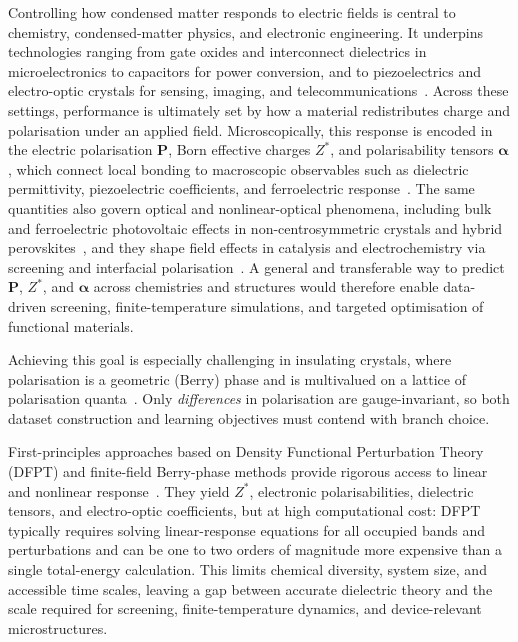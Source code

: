 \documentclass[aps,physrev,graphicx,amsmath,amssymb,
               reprint,superscriptaddress]{revtex4-2}
\begin{document}
Controlling how condensed matter responds to electric fields is central to chemistry, condensed-matter physics, and electronic engineering. It underpins technologies ranging from gate oxides and interconnect dielectrics in microelectronics to capacitors for power conversion, and to piezoelectrics and electro-optic crystals for sensing, imaging, and telecommunications~\cite{Scott2007,Damjanovic1998,Boyd2003,Robertson2006}. Across these settings, performance is ultimately set by how a material redistributes charge and polarisation under an applied field. Microscopically, this response is encoded in the electric polarisation $\mathbf P$, Born effective charges $Z^*$, and polarisability tensors $\boldsymbol\alpha$, which connect local bonding to macroscopic observables such as dielectric permittivity, piezoelectric coefficients, and ferroelectric response~\cite{king-smith-vanderbilt-1993,resta-1994,gonze_dynamical_1997,rabe_modern_2007}. The same quantities also govern optical and nonlinear-optical phenomena, including bulk and ferroelectric photovoltaic effects in non-centrosymmetric crystals and hybrid perovskites~\cite{Young2012,Cook2017,Dai2023,Butler2015Photoferroics,Frost2014MolecularFerroelectric}, and they shape field effects in catalysis and electrochemistry via screening and interfacial polarisation~\cite{Che2018,Huang2019,Leonard2021,Yu2022,Long2025}. A general and transferable way to predict $\mathbf P$, $Z^*$, and $\boldsymbol\alpha$ across chemistries and structures would therefore enable data-driven screening, finite-temperature simulations, and targeted optimisation of functional materials.

Achieving this goal is especially challenging in insulating crystals, where polarisation is a geometric (Berry) phase and is multivalued on a lattice of polarisation quanta~\cite{king-smith-vanderbilt-1993,resta-1994}. Only \emph{differences} in polarisation are gauge-invariant, so both dataset construction and learning objectives must contend with branch choice.

First-principles approaches based on Density Functional Perturbation Theory (DFPT) and finite-field Berry-phase methods provide rigorous access to linear and nonlinear response~\cite{gonze_dynamical_1997,nunes-gonze-2001,souza-iniguez-vanderbilt-2002}. They yield $Z^*$, electronic polarisabilities, dielectric tensors, and electro-optic coefficients, but at high computational cost: DFPT typically requires solving linear-response equations for all occupied bands and perturbations and can be one to two orders of magnitude more expensive than a single total-energy calculation. This limits chemical diversity, system size, and accessible time scales, leaving a gap between accurate dielectric theory and the scale required for screening, finite-temperature dynamics, and device-relevant microstructures.
\end{document}
